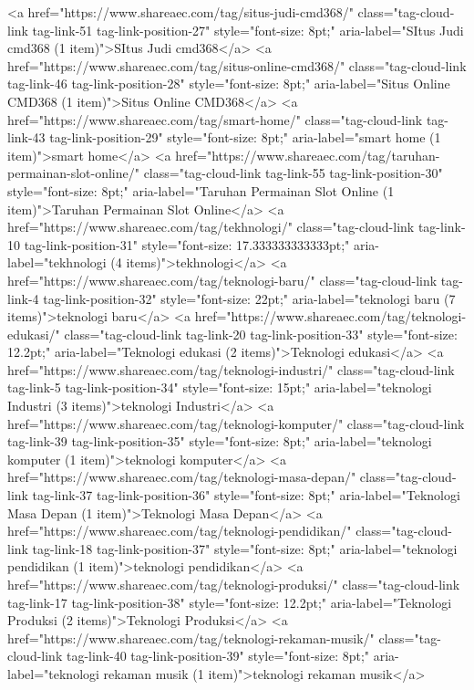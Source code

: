 {<a href="https://www.shareaec.com/tag/situs-judi-cmd368/" class="tag-cloud-link tag-link-51 tag-link-position-27" style="font-size: 8pt;" aria-label="SItus Judi cmd368 (1 item)">SItus Judi cmd368</a>
<a href="https://www.shareaec.com/tag/situs-online-cmd368/" class="tag-cloud-link tag-link-46 tag-link-position-28" style="font-size: 8pt;" aria-label="Situs Online CMD368 (1 item)">Situs Online CMD368</a>
<a href="https://www.shareaec.com/tag/smart-home/" class="tag-cloud-link tag-link-43 tag-link-position-29" style="font-size: 8pt;" aria-label="smart home (1 item)">smart home</a>
<a href="https://www.shareaec.com/tag/taruhan-permainan-slot-online/" class="tag-cloud-link tag-link-55 tag-link-position-30" style="font-size: 8pt;" aria-label="Taruhan Permainan Slot Online (1 item)">Taruhan Permainan Slot Online</a>
<a href="https://www.shareaec.com/tag/tekhnologi/" class="tag-cloud-link tag-link-10 tag-link-position-31" style="font-size: 17.333333333333pt;" aria-label="tekhnologi (4 items)">tekhnologi</a>
<a href="https://www.shareaec.com/tag/teknologi-baru/" class="tag-cloud-link tag-link-4 tag-link-position-32" style="font-size: 22pt;" aria-label="teknologi baru (7 items)">teknologi baru</a>
<a href="https://www.shareaec.com/tag/teknologi-edukasi/" class="tag-cloud-link tag-link-20 tag-link-position-33" style="font-size: 12.2pt;" aria-label="Teknologi edukasi (2 items)">Teknologi edukasi</a>
<a href="https://www.shareaec.com/tag/teknologi-industri/" class="tag-cloud-link tag-link-5 tag-link-position-34" style="font-size: 15pt;" aria-label="teknologi Industri (3 items)">teknologi Industri</a>
<a href="https://www.shareaec.com/tag/teknologi-komputer/" class="tag-cloud-link tag-link-39 tag-link-position-35" style="font-size: 8pt;" aria-label="teknologi komputer (1 item)">teknologi komputer</a>
<a href="https://www.shareaec.com/tag/teknologi-masa-depan/" class="tag-cloud-link tag-link-37 tag-link-position-36" style="font-size: 8pt;" aria-label="Teknologi Masa Depan (1 item)">Teknologi Masa Depan</a>
<a href="https://www.shareaec.com/tag/teknologi-pendidikan/" class="tag-cloud-link tag-link-18 tag-link-position-37" style="font-size: 8pt;" aria-label="teknologi pendidikan (1 item)">teknologi pendidikan</a>
<a href="https://www.shareaec.com/tag/teknologi-produksi/" class="tag-cloud-link tag-link-17 tag-link-position-38" style="font-size: 12.2pt;" aria-label="Teknologi Produksi (2 items)">Teknologi Produksi</a>
<a href="https://www.shareaec.com/tag/teknologi-rekaman-musik/" class="tag-cloud-link tag-link-40 tag-link-position-39" style="font-size: 8pt;" aria-label="teknologi rekaman musik (1 item)">teknologi rekaman musik</a>
}
